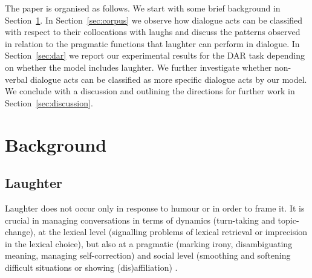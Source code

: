 \documentclass[11pt,a4paper]{article}
\begin{document}
The paper is organised as follows. We start with some brief background
in Section~\ref{sec:background}. In Section~\ref{sec:corpus} we
observe how dialogue acts can be classified with respect to their
collocations with laughs and discuss the patterns observed in relation
to the pragmatic functions that laughter can perform in dialogue. In
Section~\ref{sec:dar} we report our experimental results for the DAR
task depending on whether the model includes laughter. We further
investigate whether non-verbal dialogue acts can be classified as more
specific dialogue acts by our model.  We conclude with a discussion and
outlining the directions for further work in
Section~\ref{sec:discussion}.

\section{Background}
\label{sec:background}

\subsection{Laughter}
\label{sec:laughter}
Laughter does not occur only in
response to humour or in order to frame it.
It is crucial in managing conversations in terms of dynamics (turn-taking and
topic-change), at the lexical level (signalling problems of lexical retrieval or
imprecision in the lexical choice), but also at a pragmatic (marking irony,
disambiguating meaning, managing self-correction) and social level (smoothing and softening difficult situations or showing
(dis)affiliation)
\citep{glenn2003laughter,jefferson1984organization,mazzocconi2019phd,petitjean2015laughing}.
\end{document}
